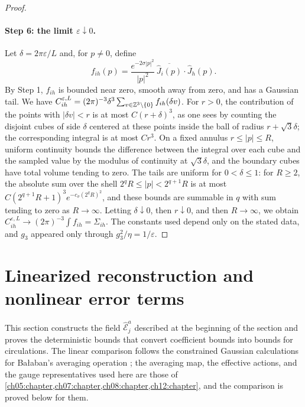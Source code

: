 \begin{proof}
\paragraph{Step 6: the limit $\varepsilon\downarrow0$.}
Let $\delta=2\pi\varepsilon/L$ and, for $p\ne0$, define
\[
 f_{ih}(p)=\frac{e^{-2\sigma|p|^2}}{|p|^2}\,\overline{\widehat J_i(p)}\cdot\widehat J_h(p).
\]
By Step 1, $f_{ih}$ is bounded near zero, smooth away from zero, and has a Gaussian tail. We have $C^{\varepsilon,L}_{ih}=(2\pi)^{-3}\delta^3\sum_{v\in\mathbb Z^3\setminus\{0\}}f_{ih}(\delta v)$. For $r>0$, the contribution of the points with $|\delta v|<r$ is at most $C(r+\delta)^3$, as one sees by counting the disjoint cubes of side $\delta$ centered at these points inside the ball of radius $r+\sqrt3\delta$; the corresponding integral is at most $Cr^3$. On a fixed annulus $r\le|p|\le R$, uniform continuity bounds the difference between the integral over each cube and the sampled value by the modulus of continuity at $\sqrt3\delta$, and the boundary cubes have total volume tending to zero. The tails are uniform for $0<\delta\le1$: for $R\ge2$, the absolute sum over the shell $2^qR\le|p|<2^{q+1}R$ is at most $C(2^{q+1}R+1)^3e^{-c_\sigma(2^qR)^2}$, and these bounds are summable in $q$ with sum tending to zero as $R\to\infty$. Letting $\delta\downarrow0$, then $r\downarrow0$, and then $R\to\infty$, we obtain $C^{\varepsilon,L}_{ih}\to(2\pi)^{-3}\int f_{ih}=\Sigma_{ih}$. The constants used depend only on the stated data, and $g_3$ appeared only through $g_3^2/\eta=1/\varepsilon$.
\end{proof}

\section{Linearized reconstruction and nonlinear error terms}\label{ch28:sec:linear}

This section constructs the field $\widehat{\mathcal E}_j^a$ described at the beginning of the section and proves the deterministic bounds that convert coefficient bounds into bounds for circulations. The linear comparison follows the constrained Gaussian calculations for Bałaban's averaging operation \cite[Section~A, (1.1)--(1.8), pp.~18--19, and Section~D, (1.47)--(1.49), p.~26, and (1.64)--(1.67), p.~29]{Balaban1984I}; the averaging map, the effective actions, and the gauge representatives used here are those of \cref{ch05:chapter,ch07:chapter,ch08:chapter,ch12:chapter}, and the comparison is proved below for them.

